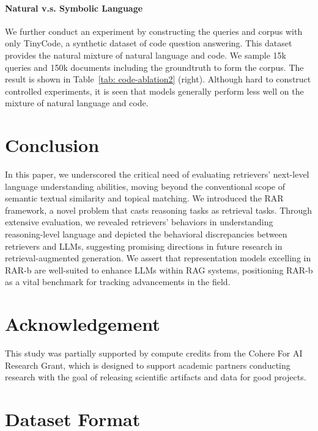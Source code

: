 \documentclass{article} %
\begin{document}
\paragraph{Natural v.s. Symbolic Language}

We further conduct an experiment by constructing the queries and corpus with only TinyCode, a synthetic dataset of code question answering. This dataset provides the natural mixture of natural language and code. We sample 15k queries and 150k documents including the groundtruth to form the corpus. The result is shown in Table~\ref{tab: code-ablation2} (right). Although hard to construct controlled experiments, it is seen that models generally perform less well on the mixture of natural language and code.


\section{Conclusion}

In this paper, we underscored the critical need of evaluating retrievers' next-level language understanding abilities, moving beyond the conventional scope of semantic textual similarity and topical matching. We introduced the RAR framework, a novel problem that casts reasoning tasks as retrieval tasks. Through extensive evaluation, we revealed retrievers' behaviors in understanding reasoning-level language and depicted the behavioral discrepancies between retrievers and LLMs, suggesting promising directions in future research in retrieval-augmented generation. We assert that representation models excelling in RAR-b are well-suited to enhance LLMs within RAG systems, positioning RAR-b as a vital benchmark for tracking advancements in the field.
% 

\section*{Acknowledgement}

This study was partially supported by compute credits from the Cohere For AI Research Grant, which is designed to support academic partners conducting research with the goal of releasing scientific artifacts and data for good projects.






\appendix
\section{Dataset Format}
\label{appendix: dataset format}
\end{document}
